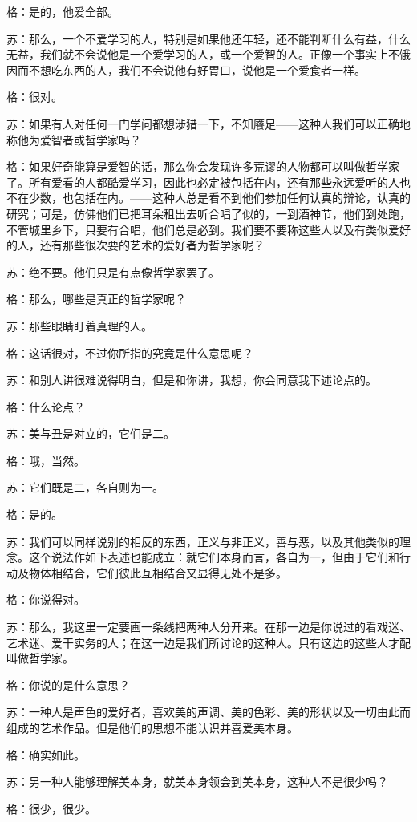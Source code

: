 \documentclass[12pt,oneside]{book}
\begin{document}
格：是的，他爱全部。

苏：那么，一个不爱学习的人，特别是如果他还年轻，还不能判断什么有益，什么无益，我们就不会说他是一个爱学习的人，或一个爱智的人。正像一个事实上不饿因而不想吃东西的人，我们不会说他有好胃口，说他是一个爱食者一样。

格：很对。

苏：如果有人对任何一门学问都想涉猎一下，不知餍足——这种人我们可以正确地称他为爱智者或哲学家吗？

格：如果好奇能算是爱智的话，那么你会发现许多荒谬的人物都可以叫做哲学家了。所有爱看的人都酷爱学习，因此也必定被包括在内，还有那些永远爱听的人也不在少数，也包括在内。——这种人总是看不到他们参加任何认真的辩论，认真的研究；可是，仿佛他们已把耳朵租出去听合唱了似的，一到酒神节，他们到处跑，不管城里乡下，只要有合唱，他们总是必到。我们要不要称这些人以及有类似爱好的人，还有那些很次要的艺术的爱好者为哲学家呢？

苏：绝不要。他们只是有点像哲学家罢了。

格：那么，哪些是真正的哲学家呢？

苏：那些眼睛盯着真理的人。

格：这话很对，不过你所指的究竟是什么意思呢？

苏：和别人讲很难说得明白，但是和你讲，我想，你会同意我下述论点的。

格：什么论点？

苏：美与丑是对立的，它们是二。

格：哦，当然。

苏：它们既是二，各自则为一。

格：是的。

苏：我们可以同样说别的相反的东西，正义与非正义，善与恶，以及其他类似的理念。这个说法作如下表述也能成立：就它们本身而言，各自为一，但由于它们和行动及物体相结合，它们彼此互相结合又显得无处不是多。

格：你说得对。

苏：那么，我这里一定要画一条线把两种人分开来。在那一边是你说过的看戏迷、艺术迷、爱干实务的人；在这一边是我们所讨论的这种人。只有这边的这些人才配叫做哲学家。

格：你说的是什么意思？

苏：一种人是声色的爱好者，喜欢美的声调、美的色彩、美的形状以及一切由此而组成的艺术作品。但是他们的思想不能认识并喜爱美本身。

格：确实如此。

苏：另一种人能够理解美本身，就美本身领会到美本身，这种人不是很少吗？

格：很少，很少。
\end{document}

